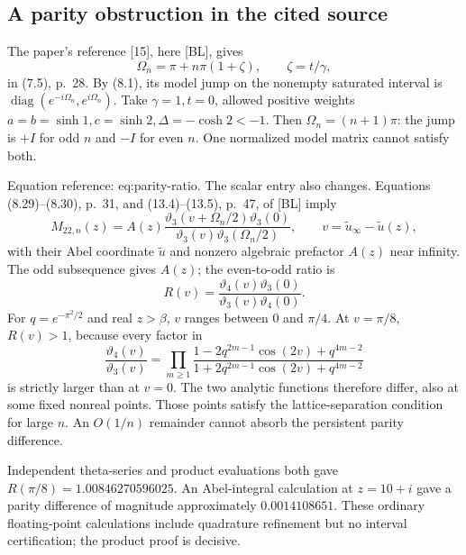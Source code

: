 \documentclass[10pt]{article}
\begin{document}
\subsection*{A parity obstruction in the cited source}
The paper’s reference [15], here [BL], gives \[\Omega_n=\pi+n\pi(1+\zeta),\qquad \zeta=t/\gamma ,\] in (7.5), p. 28. By (8.1), its model jump on the nonempty saturated interval is \(\operatorname{diag}(e^{-i\Omega_n},e^{i\Omega_n})\). Take \(\gamma=1,t=0\), allowed positive weights \(a=b=\sinh1,c=\sinh2,\Delta=-\cosh2<-1\). Then \(\Omega_n=(n+1)\pi\): the jump is \(+I\) for odd \(n\) and \(-I\) for even \(n\). One normalized model matrix cannot satisfy both.\par
Equation reference: eq:parity-ratio. The scalar entry also changes. Equations (8.29)–(8.30), p. 31, and (13.4)–(13.5), p. 47, of [BL] imply \[M_{22,n}(z)=A(z)
 \frac{\vartheta_3(v+\Omega_n/2)\vartheta_3(0)}
      {\vartheta_3(v)\vartheta_3(\Omega_n/2)},\qquad
 v=\widetilde u_\infty-\widetilde u(z),\] with their Abel coordinate \(\widetilde u\) and nonzero algebraic prefactor \(A(z)\) near infinity. The odd subsequence gives \(A(z)\); the even-to-odd ratio is \[
 R(v)=\frac{\vartheta_4(v)\vartheta_3(0)}
            {\vartheta_3(v)\vartheta_4(0)}.\] For \(q=e^{-\pi^2/2}\) and real \(z>\beta\), \(v\) ranges between \(0\) and \(\pi/4\). At \(v=\pi/8\), \(R(v)>1\), because every factor in \[\frac{\vartheta_4(v)}{\vartheta_3(v)}
 =\prod_{m\ge1}
 \frac{1-2q^{2m-1}\cos(2v)+q^{4m-2}}
      {1+2q^{2m-1}\cos(2v)+q^{4m-2}}\] is strictly larger than at \(v=0\). The two analytic functions therefore differ, also at some fixed nonreal points. Those points satisfy the lattice-separation condition for large \(n\). An \(O(1/n)\) remainder cannot absorb the persistent parity difference.\par
Independent theta-series and product evaluations both gave \(R(\pi/8)=1.00846270596025\). An Abel-integral calculation at \(z=10+i\) gave a parity difference of magnitude approximately \(0.0014108651\). These ordinary floating-point calculations include quadrature refinement but no interval certification; the product proof is decisive.\par
\end{document}
